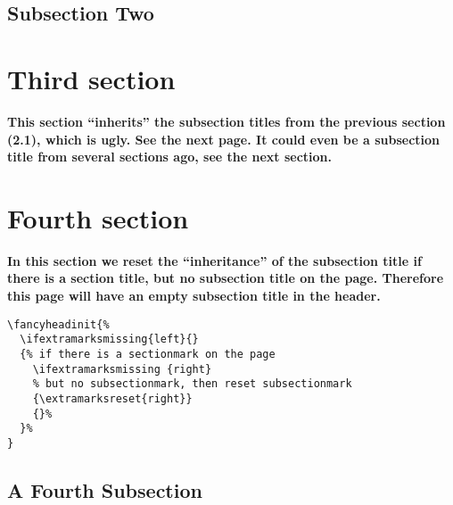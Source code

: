 \documentclass{article}
\begin{document}
 \lipsum[3]

\subsection{Subsection Two}

 \lipsum[4-7]

\section{Third section}

\textbf{This section ``inherits'' the subsection titles from the
  previous section (2.1), which is ugly. See the next page. It could
  even be a subsection title from several sections ago, see the next
  section.}

\medskip

\lipsum

\section{Fourth section}
\label{sec:missing}


\textbf{In this section we reset the ``inheritance'' of the subsection title if there is a section title, but no subsection title on the page. Therefore this page will have an empty subsection title in the header.}

\begin{verbatim}
\fancyheadinit{%
  \ifextramarksmissing{left}{}
  {% if there is a sectionmark on the page
    \ifextramarksmissing {right}
    % but no subsectionmark, then reset subsectionmark
    {\extramarksreset{right}}
    {}%
  }%
}
\end{verbatim}

\medskip

\lipsum

\subsection{A Fourth Subsection}

\lipsum[8]
\end{document}
